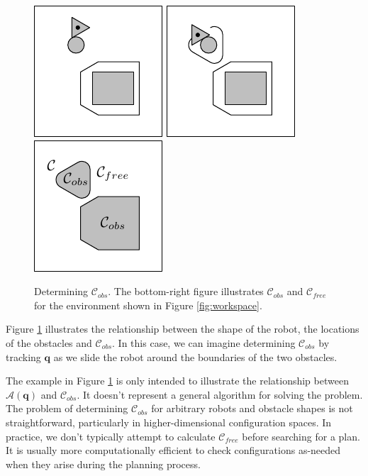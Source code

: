 \begin{figure}
\begin{center}
\includegraphics[]{planning/figs/pg_0010.pdf}\hspace{1em}
\includegraphics[]{planning/figs/pg_0014.pdf}\hspace{1em}
\includegraphics[]{planning/figs/pg_0015.pdf}
\end{center}
\caption{Determining $\mathcal{C}_{obs}$.  The bottom-right figure
  illustrates $\mathcal{C}_{obs}$ and $\mathcal{C}_{free}$ for the
  environment shown in Figure \ref{fig:workspace}.}
\label{fig:c_obs}
\end{figure}

Figure \ref{fig:c_obs} illustrates the relationship between the shape
of the robot, the locations of the obstacles and $\mathcal{C}_{obs}$.
In this case, we can imagine determining $\mathcal{C}_{obs}$ by tracking
$\mathbf{q}$ as we slide the robot around the boundaries of the two
obstacles.


The example in Figure \ref{fig:c_obs} is only intended to illustrate
the relationship between $\mathcal{A}(\mathbf{q})$ and
$\mathcal{C}_{obs}$.  It doesn't represent a general algorithm for
solving the problem. The problem of determining $\mathcal{C}_{obs}$
for arbitrary robots and obstacle shapes is not straightforward,
particularly in higher-dimensional configuration spaces.  In practice,
we don't typically attempt to calculate $\mathcal{C}_{free}$ before
searching for a plan.  It is usually more computationally efficient to
check configurations as-needed when they arise during the planning
process.

